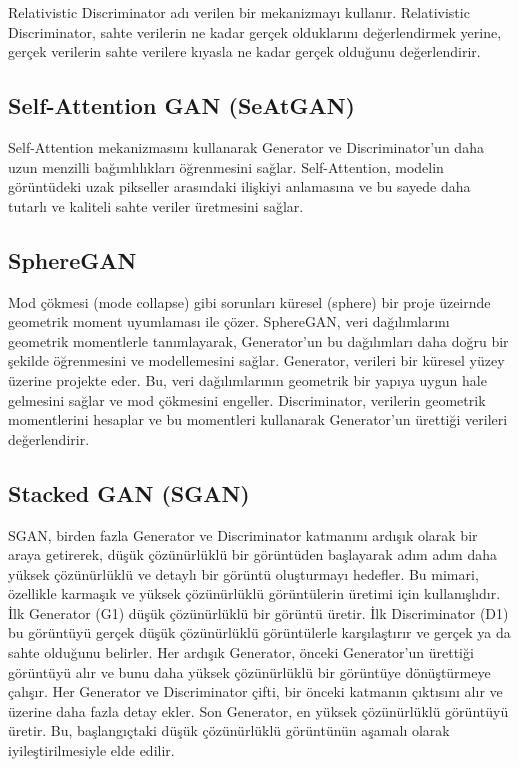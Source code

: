Relativistic Discriminator adı verilen bir mekanizmayı kullanır. Relativistic Discriminator, sahte verilerin ne kadar gerçek olduklarını değerlendirmek yerine, gerçek verilerin sahte verilere kıyasla ne kadar gerçek olduğunu değerlendirir.

\newpage

\subsection{Self-Attention GAN (SeAtGAN)}

Self-Attention mekanizmasını kullanarak Generator ve Discriminator'un daha uzun menzilli bağımlılıkları öğrenmesini sağlar. Self-Attention, modelin görüntüdeki uzak pikseller arasındaki ilişkiyi anlamasına ve bu sayede daha tutarlı ve kaliteli sahte veriler üretmesini sağlar. 

\newpage

\subsection{SphereGAN}

Mod çökmesi (mode collapse) gibi sorunları küresel (sphere) bir proje üzeirnde geometrik moment uyumlaması ile çözer. SphereGAN, veri dağılımlarını geometrik momentlerle tanımlayarak, Generator'un bu dağılımları daha doğru bir şekilde öğrenmesini ve modellemesini sağlar. Generator, verileri bir küresel yüzey üzerine projekte eder. Bu, veri dağılımlarının geometrik bir yapıya uygun hale gelmesini sağlar ve mod çökmesini engeller. Discriminator, verilerin geometrik momentlerini hesaplar ve bu momentleri kullanarak Generator'un ürettiği verileri değerlendirir.

\newpage

\subsection{Stacked GAN (SGAN)}

SGAN, birden fazla Generator ve Discriminator katmanını ardışık olarak bir araya getirerek, düşük çözünürlüklü bir görüntüden başlayarak adım adım daha yüksek çözünürlüklü ve detaylı bir görüntü oluşturmayı hedefler. Bu mimari, özellikle karmaşık ve yüksek çözünürlüklü görüntülerin üretimi için kullanışlıdır. İlk Generator (G1) düşük çözünürlüklü bir görüntü üretir. İlk Discriminator (D1) bu görüntüyü gerçek düşük çözünürlüklü görüntülerle karşılaştırır ve gerçek ya da sahte olduğunu belirler. Her ardışık Generator, önceki Generator'un ürettiği görüntüyü alır ve bunu daha yüksek çözünürlüklü bir görüntüye dönüştürmeye çalışır. Her Generator ve Discriminator çifti, bir önceki katmanın çıktısını alır ve üzerine daha fazla detay ekler. Son Generator, en yüksek çözünürlüklü görüntüyü üretir. Bu, başlangıçtaki düşük çözünürlüklü görüntünün aşamalı olarak iyileştirilmesiyle elde edilir. 

